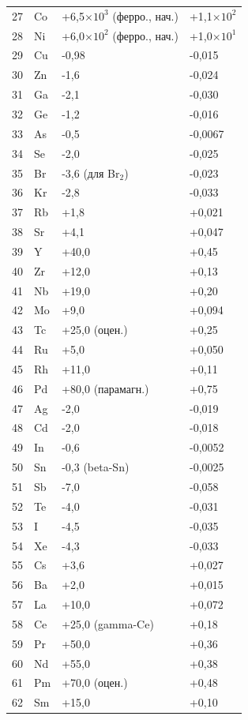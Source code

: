\documentclass[12pt,a4paper]{article}
\begin{document}
\begin{longtable}{p{0.6cm}p{1.2cm}p{2.5cm}p{2.5cm}}
		27 & Co & +6,5\(\times10^3\) (ферро., нач.) & +1,1\(\times10^2\) \\
		28 & Ni & +6,0\(\times10^2\) (ферро., нач.) & +1,0\(\times10^1\) \\
		29 & Cu & -0,98 & -0,015 \\
		30 & Zn & -1,6 & -0,024 \\
		31 & Ga & -2,1 & -0,030 \\
		32 & Ge & -1,2 & -0,016 \\
		33 & As & -0,5 & -0,0067 \\
		34 & Se & -2,0 & -0,025 \\
		35 & Br & -3,6 (для Br\(_2\)) & -0,023 \\
		36 & Kr & -2,8 & -0,033 \\
		37 & Rb & +1,8 & +0,021 \\
		38 & Sr & +4,1 & +0,047 \\
		39 & Y  & +40,0 & +0,45 \\
		40 & Zr & +12,0 & +0,13 \\
		41 & Nb & +19,0 & +0,20 \\
		42 & Mo & +9,0 & +0,094 \\
		43 & Tc & +25,0 (оцен.) & +0,25 \\
		44 & Ru & +5,0 & +0,050 \\
		45 & Rh & +11,0 & +0,11 \\
		46 & Pd & +80,0 (парамагн.) & +0,75 \\
		47 & Ag & -2,0 & -0,019 \\
		48 & Cd & -2,0 & -0,018 \\
		49 & In & -0,6 & -0,0052 \\
		50 & Sn & -0,3 (beta-Sn) & -0,0025 \\
		51 & Sb & -7,0 & -0,058 \\
		52 & Te & -4,0 & -0,031 \\
		53 & I  & -4,5 & -0,035 \\
		54 & Xe & -4,3 & -0,033 \\
		55 & Cs & +3,6 & +0,027 \\
		56 & Ba & +2,0 & +0,015 \\
		57 & La & +10,0 & +0,072 \\
		58 & Ce & +25,0 (gamma-Ce) & +0,18 \\
		59 & Pr & +50,0 & +0,36 \\
		60 & Nd & +55,0 & +0,38 \\
		61 & Pm & +70,0 (оцен.) & +0,48 \\
		62 & Sm & +15,0 & +0,10 \\

\end{longtable}
\end{document}
